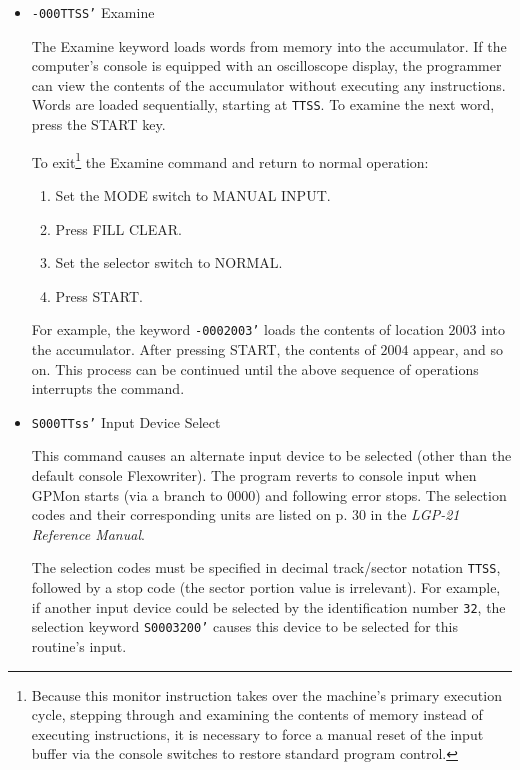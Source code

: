 \begin{itemize}
For example, the entry \texttt{A0000005' DEPRE'SS ST'ART T'O CON'TINUE'} causes the string ``DEPRESS START TO CONTINUE'' to be stored across five consecutive locations.

\item \texttt{-000TTSS'} Examine

The Examine keyword loads words from memory into the accumulator. If the computer's console is equipped with an oscilloscope display, the programmer can view the contents of the accumulator without executing any instructions. Words are loaded sequentially, starting at \texttt{TTSS}. To examine the next word, press the \textsf{START} key. 

To exit\footnote{Because this monitor instruction takes over the machine's primary execution cycle, stepping through and examining the contents of memory instead of executing instructions, it is necessary to force a manual reset of the input buffer via the console switches to restore standard program control.} the Examine command and return to normal operation:
\begin{enumerate}
    \item Set the \textsf{MODE} switch to \textsf{MANUAL INPUT}.
    \item Press \textsf{FILL CLEAR}.
    \item Set the selector switch to \textsf{NORMAL}.
    \item Press \textsf{START}.
\end{enumerate}
\noindent For example, the keyword \texttt{-0002003'} loads the contents of location $2003$ into the accumulator. After pressing \textsf{START}, the contents of $2004$ appear, and so on. This process can be continued until the above sequence of operations interrupts the command.

\item \texttt{S000TTss'} Input Device Select

This command causes an alternate input device to be selected (other than the default console Flexowriter). The program reverts to console input when GPMon starts (via a branch to $0000$) and following error stops. The selection codes and their corresponding units are listed on p. 30 in the \textit{LGP-21 Reference Manual}\cite{lgp21referencemanual}. 

The selection codes must be specified in decimal track/sector notation \texttt{TTSS}, followed by a stop code (the sector portion value is irrelevant). For example, if another input device could be selected by the identification number \texttt{32}, the selection keyword \texttt{S0003200'} causes this device to be selected for this routine's input.


\end{itemize}
